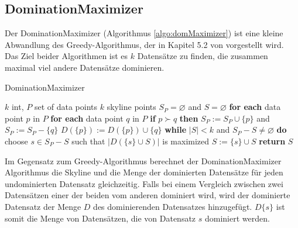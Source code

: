\subsection{DominationMaximizer}
\label{ch:Analyse:sec:repSkyAlgos:subsec:domMax}
Der DominationMaximizer (Algorithmus \ref{algo:domMaximizer}) ist eine kleine Abwandlung des Greedy-Algorithmus, der in Kapitel 5.2 von \cite{4221657} vorgestellt wird. 
Das Ziel beider Algorithmen ist es $k$ Datensätze zu finden, die zusammen maximal viel andere Datensätze dominieren.

\begin{algorithm}[H]
\caption{DominationMaximizer}\label{algo:domMaximizer}
\begin{algorithmic}[1]
\INPUTBF $k$ int, $P$ set of data points
\OUTPUTBF $k$ skyline points
\State $S_P = \varnothing$ and $S = \varnothing$
\State \textbf{for each} data point $p$ in $P$ 
\State \hspace{\algorithmicindent} \textbf{for each} data point $q$ in $P$
\State \hspace{\algorithmicindent} \hspace{\algorithmicindent} \textbf{if} $p \succ q$ \textbf{then} 
\State \hspace{\algorithmicindent} \hspace{\algorithmicindent} \hspace{\algorithmicindent} $S_P:= S_P \cup \{p\}$ and $S_P:= S_P-\{q\}$
\State \hspace{\algorithmicindent} \hspace{\algorithmicindent} \hspace{\algorithmicindent} $D(\{p\}):=D(\{p\}) \cup \{q\}$  
\State \textbf{while} $|S|<k$ and $S_P-S \neq \varnothing$ \textbf{do}
\State \hspace{\algorithmicindent} choose $s \in {S_P-S}$ such that $|D(\{s\} \cup S)|$ is maximized
\State \hspace{\algorithmicindent} $S:=\{s\} \cup S$
\State \textbf{return} $S$
\end{algorithmic}
\end{algorithm}

Im Gegensatz zum Greedy-Algorithmus berechnet der DominationMaximizer Algorithmus die Skyline und die Menge der dominierten Datensätze für jeden undominierten Datensatz gleichzeitig. Falls bei einem Vergleich zwischen zwei Datensätzen einer der beiden vom anderen dominiert wird, wird der dominierte Datensatz der Menge $D$ des dominierenden Datensatzes hinzugefügt. $D\{s\}$ ist somit die Menge von Datensätzen, die von Datensatz $s$ dominiert werden. 

